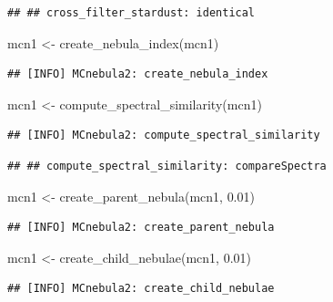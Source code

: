 \documentclass[
]{article}
\newenvironment{Shaded}{\begin{snugshade}}{\end{snugshade}}
\newcommand{\FloatTok}[1]{\textcolor[rgb]{0.00,0.00,0.81}{#1}}
\newcommand{\FunctionTok}[1]{\textcolor[rgb]{0.00,0.00,0.00}{#1}}
\newcommand{\NormalTok}[1]{#1}
\newcommand{\OtherTok}[1]{\textcolor[rgb]{0.56,0.35,0.01}{#1}}
\begin{document}
\begin{verbatim}
## ## cross_filter_stardust: identical
\end{verbatim}

\begin{Shaded}
\begin{Highlighting}[]
\NormalTok{mcn1 }\OtherTok{\textless{}{-}} \FunctionTok{create\_nebula\_index}\NormalTok{(mcn1)}
\end{Highlighting}
\end{Shaded}

\begin{verbatim}
## [INFO] MCnebula2: create_nebula_index
\end{verbatim}

\begin{Shaded}
\begin{Highlighting}[]
\NormalTok{mcn1 }\OtherTok{\textless{}{-}} \FunctionTok{compute\_spectral\_similarity}\NormalTok{(mcn1)}
\end{Highlighting}
\end{Shaded}

\begin{verbatim}
## [INFO] MCnebula2: compute_spectral_similarity
\end{verbatim}

\begin{verbatim}
## ## compute_spectral_similarity: compareSpectra
\end{verbatim}

\begin{Shaded}
\begin{Highlighting}[]
\NormalTok{mcn1 }\OtherTok{\textless{}{-}} \FunctionTok{create\_parent\_nebula}\NormalTok{(mcn1, }\FloatTok{0.01}\NormalTok{)}
\end{Highlighting}
\end{Shaded}

\begin{verbatim}
## [INFO] MCnebula2: create_parent_nebula
\end{verbatim}

\begin{Shaded}
\begin{Highlighting}[]
\NormalTok{mcn1 }\OtherTok{\textless{}{-}} \FunctionTok{create\_child\_nebulae}\NormalTok{(mcn1, }\FloatTok{0.01}\NormalTok{)}
\end{Highlighting}
\end{Shaded}

\begin{verbatim}
## [INFO] MCnebula2: create_child_nebulae
\end{verbatim}
\end{document}
